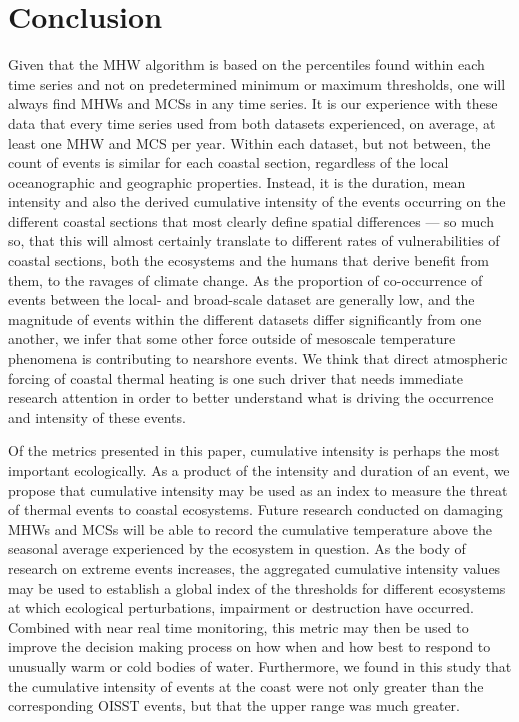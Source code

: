 \documentclass[a4paper,10pt,review]{elsarticle}
\begin{document}
\section{Conclusion}
Given that the MHW algorithm is based on the percentiles found within each time series and not on predetermined minimum or maximum thresholds, one will always find MHWs and MCSs in any time series. It is our experience with these data that every time series used from both datasets experienced, on average, at least one MHW and MCS per year. Within each dataset, but not between, the count of events is similar for each coastal section, regardless of the local oceanographic and geographic properties. Instead, it is the duration, mean intensity and also the derived cumulative intensity of the events occurring on the different coastal sections that most clearly define spatial differences --- so much so, that this will almost certainly translate to different rates of vulnerabilities of coastal sections, both the ecosystems and the humans that derive benefit from them, to the ravages of climate change. As the proportion of co-occurrence of events between the local- and broad-scale dataset are generally low, and the magnitude of events within the different datasets differ significantly from one another, we infer that some other force outside of mesoscale temperature phenomena is contributing to nearshore events. We think that direct atmospheric forcing of coastal thermal heating is one such driver that needs immediate research attention in order to better understand what is driving the occurrence and intensity of these events.

Of the metrics presented in this paper, cumulative intensity is perhaps the most important ecologically. As a product of the intensity and duration of an event, we propose that cumulative intensity may be used as an index to measure the threat of thermal events to coastal ecosystems. Future research conducted on damaging MHWs and MCSs will be able to record the cumulative temperature above the seasonal average experienced by the ecosystem in question. As the body of research on extreme events increases, the aggregated cumulative intensity values may be used to establish a global index of the thresholds for different ecosystems at which ecological perturbations, impairment or destruction have occurred. Combined with near real time monitoring, this metric may then be used to improve the decision making process on how when and how best to respond to unusually warm or cold bodies of water. Furthermore, we found in this study that the cumulative intensity of events at the coast were not only greater than the corresponding OISST events, but that the upper range was much greater.
\end{document}
